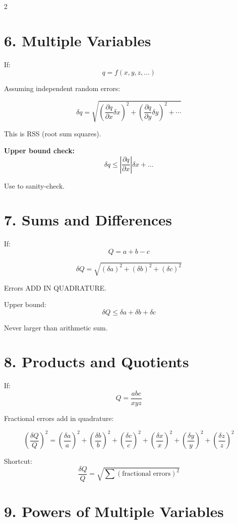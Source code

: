 \documentclass[10pt,landscape]{article}
\begin{document}
\begin{multicols}{2}
\section*{6. Multiple Variables}

If:
\[
q = f(x,y,z,...)
\]

Assuming independent random errors:

\[
\boxed{
\delta q = \sqrt{
\left(\frac{\partial q}{\partial x}\delta x\right)^2 +
\left(\frac{\partial q}{\partial y}\delta y\right)^2 +
\cdots
}}
\]

This is RSS (root sum squares).

\textbf{Upper bound check:}
\[
\delta q \le \left|\frac{\partial q}{\partial x}\right|\delta x + ...
\]

Use to sanity-check.

\section*{7. Sums and Differences}

If:
\[
Q = a + b - c
\]

\[
\boxed{\delta Q = \sqrt{(\delta a)^2 + (\delta b)^2 + (\delta c)^2}}
\]

Errors ADD IN QUADRATURE.

Upper bound:
\[
\delta Q \le \delta a + \delta b + \delta c
\]

Never larger than arithmetic sum.

\section*{8. Products and Quotients}

If:
\[
Q = \frac{abc}{xyz}
\]

Fractional errors add in quadrature:

\[
\boxed{
\left(\frac{\delta Q}{Q}\right)^2 =
\left(\frac{\delta a}{a}\right)^2 +
\left(\frac{\delta b}{b}\right)^2 +
\left(\frac{\delta c}{c}\right)^2 +
\left(\frac{\delta x}{x}\right)^2 +
\left(\frac{\delta y}{y}\right)^2 +
\left(\frac{\delta z}{z}\right)^2
}
\]

Shortcut:
\[
\frac{\delta Q}{Q} = \sqrt{\sum (\text{fractional errors})^2}
\]

\section*{9. Powers of Multiple Variables}


\end{multicols}
\end{document}

